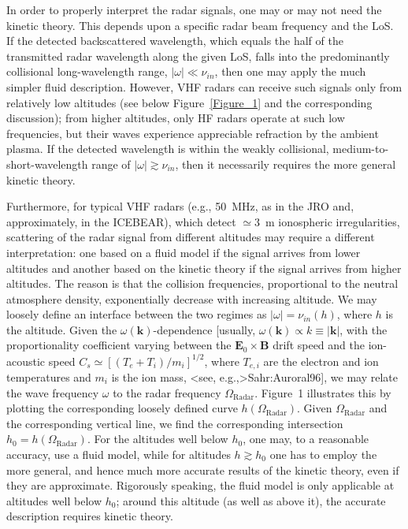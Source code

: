 \documentclass[draft]{agujournal2019}
\renewcommand{\vec}{\mathbf}
\begin{document}
In order to properly interpret the radar signals, one may or may not need the
kinetic theory. This depends upon a specific radar beam frequency and the LoS.
If the detected backscattered wavelength, which equals the half of the
transmitted radar wavelength along the given LoS, falls into the predominantly
collisional long-wavelength range, $|\omega|\ll\nu_{in}$, then one may apply
the much simpler fluid description. However, VHF radars can receive such signals 
only from relatively low altitudes (see below Figure~\ref{Figure_1} and the 
corresponding discussion); from higher altitudes, only HF radars operate at such low 
frequencies, but their waves experience appreciable refraction by the ambient plasma. 
If the detected wavelength is within the weakly collisional, medium-to-short-wavelength range of $|\omega|\gtrsim\nu_{in}$, then
it necessarily requires the more general kinetic theory. 

Furthermore, for typical VHF radars (e.g., 50~MHz, as in the JRO and, approximately, in the
ICEBEAR), which detect $\simeq 3$~m ionospheric irregularities, scattering of the radar
signal from different altitudes may require a different interpretation: one
based on a fluid model if the signal arrives from lower altitudes and another
based on the kinetic theory if the signal arrives from higher altitudes. The
reason is that the collision frequencies, proportional to the neutral
atmosphere density, exponentially decrease with increasing altitude. We may
loosely define an interface between the two regimes as $|\omega|=\nu_{in}(h)$,
where $h$ is the altitude. Given the $\omega(\vec{k})$-dependence [usually,
$\omega(\vec{k})\propto k\equiv|\vec{k}|$, with the proportionality coefficient
varying between the $\vec{E}_{0}\times\vec{B}$ drift speed and the
ion-acoustic speed $C_{s}\simeq[(T_{e}+T_{i})/m_{i}]^{1/2}$, where
$T_{e,i}$ are the electron and ion temperatures and $m_{i}$ is the ion mass,
\citeA<see, e.g.,>{Sahr:Auroral96}], we may relate the wave frequency
$\omega$ to the radar frequency $\Omega_{\mathrm{Radar}}$. Figure~1
illustrates this by plotting the corresponding loosely defined curve
$h(\Omega_{\mathrm{Radar}})$. Given $\Omega_{\mathrm{Radar}}$ and the
corresponding vertical line, we find the corresponding intersection
$h_{0}=h(\Omega_{\mathrm{Radar}})$. For the altitudes well below $h_{0}$, one
may, to a reasonable accuracy, use a fluid model, while for altitudes
$h\gtrsim h_{0}$ one has to employ the more general, and hence much more
accurate results of the kinetic theory, even if they are approximate. Rigorously speaking, 
the fluid model is only applicable at altitudes well below $h_{0}$; 
around this altitude (as well as above it), the accurate description requires kinetic theory.
\end{document}
